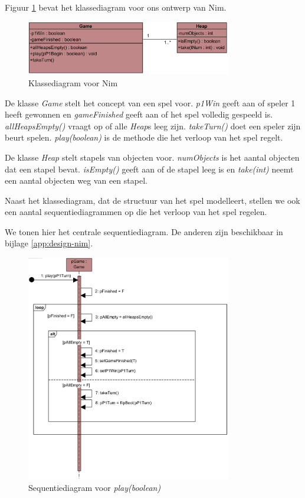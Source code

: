 Figuur \ref{fig:nim-cd} bevat het klassediagram voor ons ontwerp van Nim.

\begin{figure}[htp]
	\centering
	\includegraphics[width=0.8\textwidth]{chap-evaluatie/ClassDiagram1.png}
	\caption{Klassediagram voor Nim}
	\label{fig:nim-cd}
\end{figure}

De klasse \textit{Game} stelt het concept van een spel voor. \textit{p1Win} geeft aan of speler 1 heeft gewonnen en \textit{gameFinished} geeft aan of het spel volledig gespeeld is. \textit{allHeapsEmpty()} vraagt op of alle \textit{Heap}s leeg zijn. \textit{takeTurn()} doet een speler zijn beurt spelen. \textit{play(boolean)} is de methode die het verloop van het spel regelt.

De klasse \textit{Heap} stelt stapels van objecten voor. \textit{numObjects} is het aantal objecten dat een stapel bevat. \textit{isEmpty()} geeft aan of de stapel leeg is en \textit{take(int)} neemt een aantal objecten weg van een stapel.

Naast het klassediagram, dat de structuur van het spel modelleert, stellen we ook een aantal sequentiediagrammen op die het verloop van het spel regelen.

We tonen hier het centrale sequentiediagram. De anderen zijn beschikbaar in bijlage \ref{app:design-nim}.

\begin{figure}
	\centering
	\includegraphics[width=0.8\textwidth]{chap-evaluatie/play.png}
	\caption{Sequentiediagram voor \textit{play(boolean)}}
	\label{fig:nim-play}
\end{figure}

